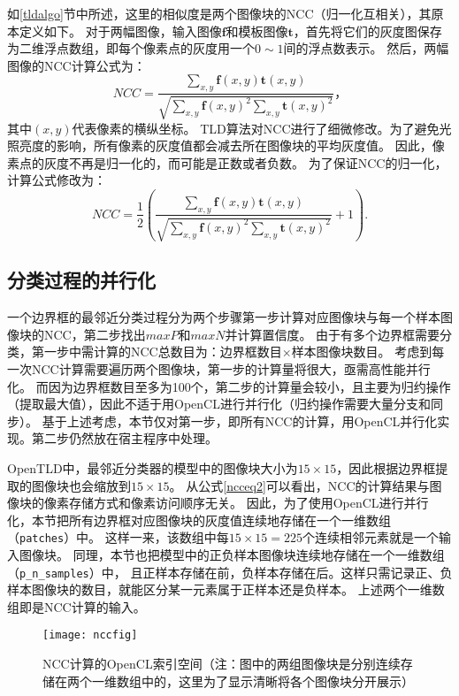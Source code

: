 如\ref{tldalgo}节中所述，这里的相似度是两个图像块的NCC（归一化互相关），其原本定义如下。
对于两幅图像，输入图像$\mathbf{f}$和模板图像$\mathbf{t}$，首先将它们的灰度图保存为二维浮点数组，即每个像素点的灰度用一个$0\sim1$间的浮点数表示。
然后，两幅图像的NCC计算公式为：
\begin{equation}
\label{ncceq}
NCC = \frac{ \sum_{x,y}\mathbf{f}(x, y)\mathbf{t}(x, y) }{ \sqrt{\sum_{x,y}\mathbf{f}(x, y)^2\sum_{x,y}\mathbf{t}(x, y)^2} } ，
\end{equation}
其中$(x, y)$代表像素的横纵坐标。
TLD算法对NCC进行了细微修改。为了避免光照亮度的影响，所有像素的灰度值都会减去所在图像块的平均灰度值。
因此，像素点的灰度不再是归一化的，而可能是正数或者负数。
为了保证NCC的归一化，计算公式修改为：
\begin{equation}
\label{ncceq2}
NCC = \frac{1}{2}( \frac{ \sum_{x,y}\mathbf{f}(x, y)\mathbf{t}(x, y) }{ \sqrt{\sum_{x,y}\mathbf{f}(x, y)^2\sum_{x,y}\mathbf{t}(x, y)^2} } + 1 ).
\end{equation}

\subsection{分类过程的并行化}
一个边界框的最邻近分类过程分为两个步骤\pozhehao 第一步计算对应图像块与每一个样本图像块的NCC，第二步找出$maxP$和$maxN$并计算置信度。
由于有多个边界框需要分类，第一步中需计算的NCC总数目为：边界框数目$\times$样本图像块数目。
考虑到每一次NCC计算需要遍历两个图像块，第一步的计算量将很大，亟需高性能并行化。
而因为边界框数目至多为100个，第二步的计算量会较小，且主要为归约操作（提取最大值），因此不适于用OpenCL进行并行化（归约操作需要大量分支和同步）。
基于上述考虑，本节仅对第一步，即所有NCC的计算，用OpenCL并行化实现。第二步仍然放在宿主程序中处理。

OpenTLD中，最邻近分类器的模型中的图像块大小为$15\times15$，因此根据边界框提取的图像块也会缩放到$15\times15$。
从公式\ref{ncceq2}可以看出，NCC的计算结果与图像块的像素存储方式和像素访问顺序无关。
因此，为了使用OpenCL进行并行化，本节把所有边界框对应图像块的灰度值连续地存储在一个一维数组（\texttt{patches}）中。
这样一来，该数组中每$15\times15=225$个连续相邻元素就是一个输入图像块。
同理，本节也把模型中的正负样本图像块连续地存储在一个一维数组（\texttt{p\_n\_samples}）中，
且正样本存储在前，负样本存储在后。这样只需记录正、负样本图像块的数目，就能区分某一元素属于正样本还是负样本。
上述两个一维数组即是NCC计算的输入。

\begin{figure}[htb]
  \centering
  \texttt{[image: nccfig]}
  \caption{NCC计算的OpenCL索引空间（注：图中的两组图像块是分别连续存储在两个一维数组中的，这里为了显示清晰将各个图像块分开展示）}
  \label{nccfig}
\end{figure}

